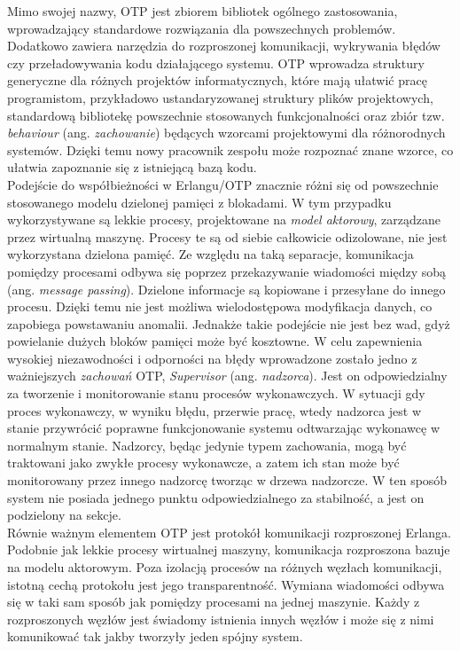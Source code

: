 \documentclass[12pt,twoside]{article}
\begin{document}
Mimo swojej nazwy, OTP jest zbiorem bibliotek ogólnego zastosowania,
wprowadzający standardowe rozwiązania dla powszechnych problemów.
Dodatkowo zawiera narzędzia do rozproszonej komunikacji, wykrywania
błędów czy przeładowywania kodu działającego systemu. OTP wprowadza
struktury generyczne dla różnych projektów informatycznych, które mają
ułatwić pracę programistom, przykładowo ustandaryzowanej struktury
plików projektowych, standardową bibliotekę powszechnie stosowanych
funkcjonalności oraz zbiór tzw. \emph{behaviour} (ang.
\emph{zachowanie}) będących wzorcami projektowymi dla różnorodnych
systemów. Dzięki temu nowy pracownik zespołu może rozpoznać znane
wzorce, co ułatwia zapoznanie się z istniejącą bazą kodu.\\
Podejście do współbieżności w Erlangu/OTP znacznie różni się od
powszechnie stosowanego modelu dzielonej pamięci z blokadami. W tym
przypadku wykorzystywane są lekkie procesy, projektowane na \emph{model
aktorowy}, zarządzane przez wirtualną maszynę. Procesy te są od siebie
całkowicie odizolowane, nie jest wykorzystana dzielona pamięć. Ze
względu na taką separacje, komunikacja pomiędzy procesami odbywa się
poprzez przekazywanie wiadomości między sobą (ang. \emph{message
passing}). Dzielone informacje są kopiowane i przesyłane do innego
procesu. Dzięki temu nie jest możliwa wielodostępowa modyfikacja danych,
co zapobiega powstawaniu anomalii. Jednakże takie podejście nie jest bez
wad, gdyż powielanie dużych bloków pamięci może być kosztowne. W celu
zapewnienia wysokiej niezawodności i odporności na błędy wprowadzone
zostało jedno z ważniejszych \emph{zachowań} OTP, \emph{Supervisor}
(ang. \emph{nadzorca}). Jest on odpowiedzialny za tworzenie i
monitorowanie stanu procesów wykonawczych. W sytuacji gdy proces
wykonawczy, w wyniku błędu, przerwie pracę, wtedy nadzorca jest w stanie
przywrócić poprawne funkcjonowanie systemu odtwarzając wykonawcę w
normalnym stanie. Nadzorcy, będąc jedynie typem zachowania, mogą być
traktowani jako zwykłe procesy wykonawcze, a zatem ich stan może być
monitorowany przez innego nadzorcę tworząc w drzewa nadzorcze. W ten
sposób system nie posiada jednego punktu odpowiedzialnego za stabilność,
a jest on podzielony na sekcje.\\
Równie ważnym elementem OTP jest protokół komunikacji rozproszonej
Erlanga. Podobnie jak lekkie procesy wirtualnej maszyny, komunikacja
rozproszona bazuje na modelu aktorowym. Poza izolacją procesów na
różnych węzłach komunikacji, istotną cechą protokołu jest jego
transparentność. Wymiana wiadomości odbywa się w taki sam sposób jak
pomiędzy procesami na jednej maszynie. Każdy z rozproszonych węzłów jest
świadomy istnienia innych węzłów i może się z nimi komunikować tak jakby
tworzyły jeden spójny system.\autocite{logan2010erlang}
\end{document}
